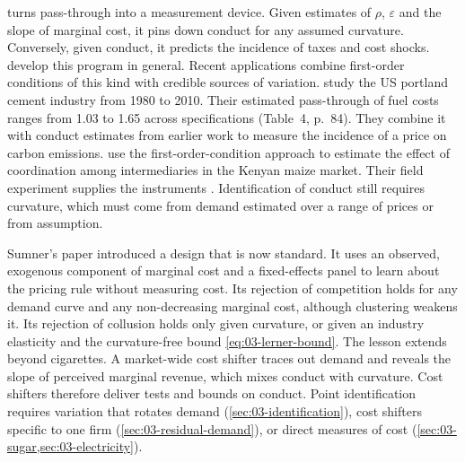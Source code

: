 \begin{remark}\label{rem:03-passthrough-tool}
 turns pass-through into a measurement device. Given estimates of $\rho$, $\varepsilon$
and the slope of marginal cost, it pins down conduct for any assumed curvature. Conversely, given conduct, it predicts
the incidence of taxes and cost shocks. \citet{WeylFabinger2013} develop this program in general. Recent applications
combine first-order conditions of this kind with credible sources of variation. \citet{MillerOsborneSheu2017} study
the US portland cement industry from 1980 to 2010. Their estimated pass-through of fuel costs ranges from 1.03 to 1.65
across specifications (Table~4, p.~84). They combine it with conduct estimates from earlier work to measure the incidence
of a price on carbon emissions.
\citet{BergquistDinerstein2020} use the first-order-condition approach to estimate the effect of coordination among
intermediaries in the Kenyan maize market. Their field experiment supplies the instruments
\citep[p.~214, n.~86]{AskerNocke2021}.
Identification of conduct still requires curvature, which must come from demand estimated over a range of prices or
from assumption.
\end{remark}

Sumner's paper introduced a design that is now standard. It uses an observed, exogenous component of marginal cost
and a fixed-effects panel to learn about the pricing rule without measuring cost. Its rejection of competition holds for
any demand curve and any non-decreasing marginal cost, although clustering weakens it. Its rejection of collusion holds
only given curvature, or given an industry elasticity and the curvature-free bound \eqref{eq:03-lerner-bound}. The
lesson extends beyond cigarettes. A market-wide cost shifter traces out demand and reveals the slope of perceived
marginal revenue, which mixes conduct with curvature. Cost shifters therefore deliver tests and bounds on conduct.
Point identification requires variation that rotates demand (\cref{sec:03-identification}), cost shifters specific to
one firm (\cref{sec:03-residual-demand}), or direct measures of cost (\cref{sec:03-sugar,sec:03-electricity}).
